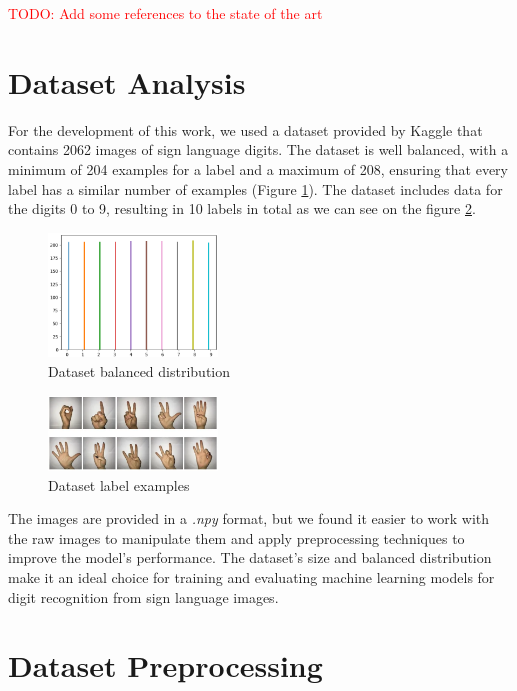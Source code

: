 \documentclass[conference]{IEEEtran}
\begin{document}
\textcolor{red}{TODO: Add some references to the state of the art}
\section{Dataset Analysis}
For the development of this work, we used a dataset provided by Kaggle that contains 2062 images of sign language digits. The dataset is well balanced, with a minimum of 204 examples for a label and a maximum of 208, ensuring that every label has a similar number of examples (Figure \ref{fig:dataset-balanced}). The dataset includes data for the digits 0 to 9, resulting in 10 labels in total as we can see on the figure \ref{fig:dataset-examples}. 

\begin{figure}[h]
    \centering
    \includegraphics[width=0.4\textwidth]{assets/dataset-labels.png}
    \caption{Dataset balanced distribution}
    \label{fig:dataset-balanced}
\end{figure}


\begin{figure}[h]
    \centering
    \includegraphics[width=0.4\textwidth]{assets/sign-language-digits.png}
    \caption{Dataset label examples}
    \label{fig:dataset-examples}
\end{figure}

The images are provided in a \textit{.npy} format, but we found it easier to work with the raw images to manipulate them and apply preprocessing techniques to improve the model's performance. The dataset's size and balanced distribution make it an ideal choice for training and evaluating machine learning models for digit recognition from sign language images.

\section{Dataset Preprocessing}
\end{document}
